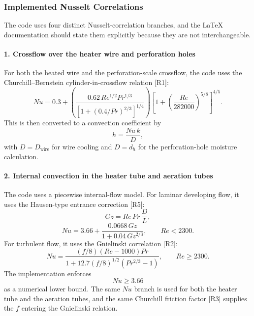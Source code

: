 \documentclass{article}
\begin{document}
\subsubsection{Implemented Nusselt Correlations}

The code uses four distinct Nusselt-correlation branches, and the \LaTeX{}
documentation should state them explicitly because they are not interchangeable.

\paragraph*{1. Crossflow over the heater wire and perforation holes}

For both the heated wire and the perforation-scale crossflow, the code uses
the Churchill--Bernstein cylinder-in-crossflow relation [R1]:
\begin{equation}
Nu
=
0.3+
\left(
\frac{0.62\,Re^{1/2}Pr^{1/3}}
{\left[1+\left(0.4/Pr\right)^{2/3}\right]^{1/4}}
\right)
\left[1+\left(\frac{Re}{282000}\right)^{5/8}\right]^{4/5}.
\end{equation}
This is then converted to a convection coefficient by
\begin{equation}
h = \frac{Nu\,k}{D},
\end{equation}
with $D=D_{\mathrm{wire}}$ for wire cooling and $D=d_h$ for the
perforation-hole moisture calculation.

\paragraph*{2. Internal convection in the heater tube and aeration tubes}

The code uses a piecewise internal-flow model. For laminar developing flow,
it uses the Hausen-type entrance correction [R5]:
\begin{equation}
Gz = Re\,Pr\,\frac{D}{L},
\end{equation}
\begin{equation}
Nu
=
3.66+\frac{0.0668\,Gz}{1+0.04\,Gz^{2/3}},
\qquad Re<2300.
\end{equation}
For turbulent flow, it uses the Gnielinski correlation [R2]:
\begin{equation}
Nu
=
\frac{(f/8)(Re-1000)Pr}
{1+12.7(f/8)^{1/2}(Pr^{2/3}-1)},
\qquad Re\ge 2300.
\end{equation}
The implementation enforces
\begin{equation}
Nu \ge 3.66
\end{equation}
as a numerical lower bound. The same $Nu$ branch is used for both the heater
tube and the aeration tubes, and the same Churchill friction factor [R3]
supplies the $f$ entering the Gnielinski relation.
\end{document}
